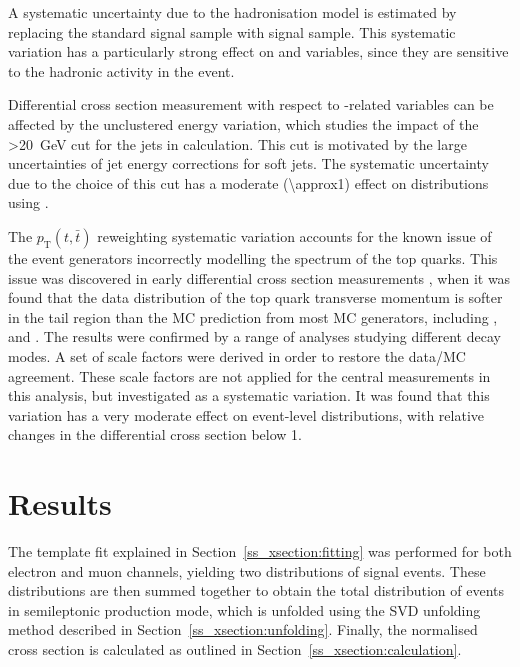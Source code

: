 A systematic uncertainty due to the hadronisation model is estimated by replacing the standard \MADGRAPH \ttbar signal
sample with \MCATNLO signal sample. This systematic variation has a particularly strong effect on \HT and \ST variables,
since they are sensitive to the hadronic activity in the event.

Differential cross section measurement with respect to \MET-related variables can be affected by the unclustered energy
variation, which studies the impact of the \pt\SI{>20}{\GeV} cut for the jets in \MET calculation. This cut is
motivated by the large uncertainties of jet energy corrections for soft jets. The systematic uncertainty due to the
choice of this cut has a moderate (\SI{\approx1}{\pc}) effect on distributions using \MET.

The $p_\mathrm{T}(t,\bar{t})$ reweighting systematic variation accounts for the known issue of the event generators
incorrectly modelling the \pt spectrum of the top quarks. This issue was discovered in early differential cross section
measurements \autocite{CMS_diff_xsections_7TeV}, when it was found that the data distribution of the top quark
transverse momentum is softer in the tail region than the MC prediction from most MC generators, including \MADGRAPH,
\POWHEG and \MCATNLO. The results were confirmed by a range of analyses studying different \ttbar decay modes. A set of
scale factors were derived in order to restore the data/MC agreement. These scale factors are not applied for the
central measurements in this analysis, but investigated as a systematic variation. It was found that this variation has
a very moderate effect on event-level distributions, with relative changes in the differential cross section below
\SI{1}{\pc}.







\section{Results}
\label{s_xsection:results}
The template fit explained in Section~\ref{ss_xsection:fitting} was performed for both electron and muon channels,
yielding two distributions of signal \ttbar events. These distributions are then summed together to obtain the total
distribution of \ttbar events in semileptonic production mode, which is unfolded using the SVD unfolding method
described in Section~\ref{ss_xsection:unfolding}. Finally, the normalised cross section is calculated as outlined in
Section~\ref{ss_xsection:calculation}.

